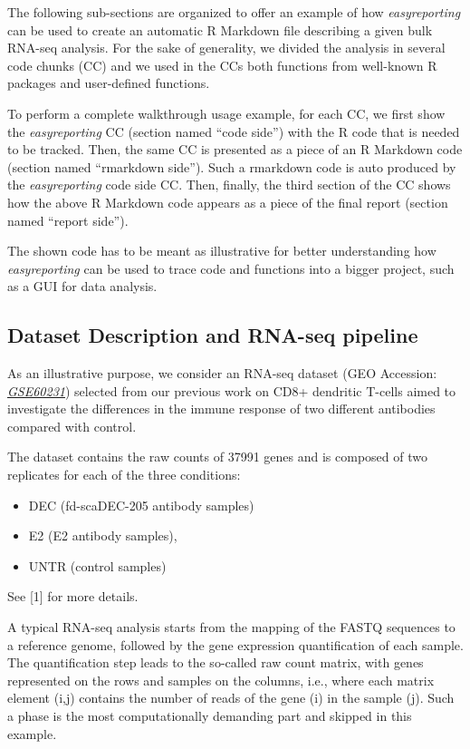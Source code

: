 \documentclass[]{article}
\begin{document}
The following sub-sections are organized to offer an example of how
\emph{easyreporting} can be used to create an automatic R Markdown file
describing a given bulk RNA-seq analysis. For the sake of generality, we
divided the analysis in several code chunks (CC) and we used in the CCs
both functions from well-known R packages and user-defined functions.

To perform a complete walkthrough usage example, for each CC, we first
show the \emph{easyreporting} CC (section named ``code side'') with the
R code that is needed to be tracked. Then, the same CC is presented as a
piece of an R Markdown code (section named ``rmarkdown side''). Such a
rmarkdown code is auto produced by the \emph{easyreporting} code side
CC. Then, finally, the third section of the CC shows how the above R
Markdown code appears as a piece of the final report (section named
``report side'').

The shown code has to be meant as illustrative for better understanding
how \emph{easyreporting} can be used to trace code and functions into a
bigger project, such as a GUI for data analysis.

\hypertarget{dataset-description-and-rna-seq-pipeline}{%
\subsection{Dataset Description and RNA-seq
pipeline}\label{dataset-description-and-rna-seq-pipeline}}

As an illustrative purpose, we consider an RNA-seq dataset (GEO
Accession:
\href{https://www.ncbi.nlm.nih.gov/geo/query/acc.cgi?acc=GSE60231}{\emph{GSE60231}})
selected from our previous work on CD8+ dendritic T-cells aimed to
investigate the differences in the immune response of two different
antibodies compared with control.

The dataset contains the raw counts of 37991 genes and is composed of
two replicates for each of the three conditions:

\begin{itemize}
\item
  DEC (fd-scaDEC-205 antibody samples)
\item
  E2 (E2 antibody samples),
\item
  UNTR (control samples)
\end{itemize}

See {[}1{]} for more details.

A typical RNA-seq analysis starts from the mapping of the FASTQ
sequences to a reference genome, followed by the gene expression
quantification of each sample. The quantification step leads to the
so-called raw count matrix, with genes represented on the rows and
samples on the columns, i.e., where each matrix element (i,j) contains
the number of reads of the gene (i) in the sample (j). Such a phase is
the most computationally demanding part and skipped in this example.
\end{document}
